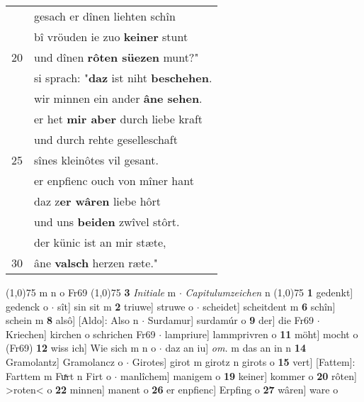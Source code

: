 \documentclass[8pt,a4paper,notitlepage]{article}
\begin{document}
\begin{table}[ht]
\begin{minipage}[t]{0.5\linewidth}
\begin{tabular}{rl}
 & gesach er dînen liehten schîn\\ 
 & bî vröuden ie zuo \textbf{keiner} stunt\\ 
20 & und dînen \textbf{rôten süezen} munt?"\\ 
 & si sprach: "\textbf{daz} ist niht \textbf{beschehen}.\\ 
 & wir minnen ein ander \textbf{âne sehen}.\\ 
 & er het \textbf{mir aber} durch liebe kraft\\ 
 & und durch rehte geselleschaft\\ 
25 & sînes kleinôtes vil gesant.\\ 
 & er enpfienc ouch von mîner hant\\ 
 & daz z\textbf{er wâren} liebe hôrt\\ 
 & und uns \textbf{beiden} zwîvel stôrt.\\ 
 & der künic ist an mir stæte,\\ 
30 & âne \textbf{valsch} herzen ræte."\\ 
\end{tabular}
\scriptsize
\line(1,0){75} \newline
m n o Fr69 \newline
\line(1,0){75} \newline
\textbf{3} \textit{Initiale} m   $\cdot$ \textit{Capitulumzeichen} n  \newline
\line(1,0){75} \newline
\textbf{1} gedenkt] gedenck o  $\cdot$ sît] sin sit m \textbf{2} triuwe] struwe o  $\cdot$ scheidet] scheitdent m \textbf{6} schîn] schein m \textbf{8} alsô] [Aldo]: Also n  $\cdot$ Surdamur] surdamúr o \textbf{9} der] die Fr69  $\cdot$ Kriechen] kirchen o schrichen Fr69  $\cdot$ lampriure] lammprivren o \textbf{11} möht] mocht o (Fr69) \textbf{12} wiss ich] Wie sich m n o  $\cdot$ daz an iu] \textit{om.} m das an in n \textbf{14} Gramolantz] Gramolancz o  $\cdot$ Girotes] girot m girotz n girots o \textbf{15} vert] [Fattem]: Farttem m Fuͯrt n Firt o  $\cdot$ manlîchem] manigem o \textbf{19} keiner] kommer o \textbf{20} rôten] >roten< o \textbf{22} minnen] manent o \textbf{26} er enpfienc] Erpfing o \textbf{27} wâren] ware o \newline
\end{minipage}
\end{table}
\newpage
\end{document}
